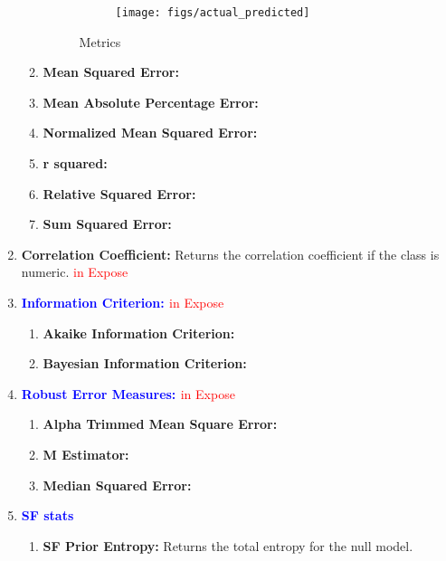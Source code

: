 \documentclass[a4paper,12pt, english]{article}
\begin{document}
\begin{enumerate}
\begin{enumerate}
\begin{figure}[h]
        \begin{subfigure}[b]{0.23\textwidth}
                \texttt{[image: figs/actual\_predicted]}
                \label{fig:ap}
        \end{subfigure}
        \caption{Metrics}\label{fig:metrics}
\end{figure}

\item \textbf{Mean Squared Error: } %
\item \textbf{Mean Absolute Percentage Error: } %
\item \textbf{Normalized Mean Squared Error: } %
\item \textbf{r squared: } %
\item \textbf{Relative Squared Error: } %
\item \textbf{Sum Squared Error: } %
				 
\end{enumerate} 

\item \textbf{Correlation Coefficient: }
          Returns the correlation coefficient if the class is numeric.   \textcolor{red}{in Expose} 

\item \textbf{\textcolor{blue}{Information Criterion: }} \textcolor{red}{in Expose} 
\begin{enumerate}
\item \textbf{Akaike Information Criterion: }
\item \textbf{Bayesian Information Criterion: }          

\end{enumerate}

\item \textbf{\textcolor{blue}{Robust Error Measures: }} \textcolor{red}{in Expose}
\begin{enumerate}
\item \textbf{Alpha Trimmed Mean Square Error: }
\item \textbf{M Estimator: } 
\item \textbf{Median Squared Error: }
\end{enumerate}


\item \textbf{\textcolor{blue}{SF stats}}
\begin{enumerate}
\item \textbf{SF Prior Entropy: }
          Returns the total entropy for the null model.


\end{enumerate}
\end{enumerate}
\end{document}
